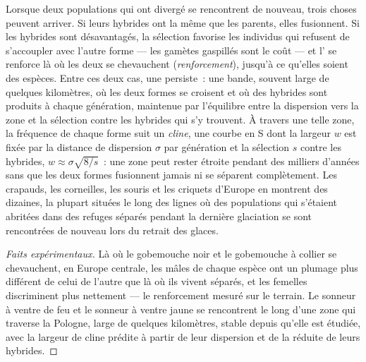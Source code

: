 \begin{proposition}\label{prop:b2:speciation:reinforcement}
Lorsque deux populations qui ont divergé se rencontrent de nouveau, trois
choses peuvent arriver. Si leurs hybrides ont la même  que
les parents, elles fusionnent. Si les hybrides sont désavantagés, la
sélection favorise les individus qui refusent de s'accoupler avec l'autre
forme --- les gamètes gaspillés sont le coût --- et l' se renforce là où les deux se chevauchent
(\emph{renforcement}), jusqu'à ce qu'elles soient des espèces. Entre ces
deux cas, une \emph{} persiste~: une bande, souvent large de
quelques kilomètres, où les deux formes se croisent et où des hybrides
sont produits à chaque génération, maintenue par l'équilibre entre la
dispersion vers la zone et la sélection contre les hybrides qui s'y
trouvent. À travers une telle zone, la fréquence de chaque forme suit un
\emph{cline}, une courbe en S dont la largeur $w$ est fixée par la
distance de dispersion $\sigma$ par génération et la sélection $s$ contre
les hybrides, $w \approx
\sigma\sqrt{8/s}$~: une zone peut rester étroite pendant des milliers
d'années sans que les deux formes fusionnent jamais ni se séparent
complètement. Les crapauds, les corneilles, les souris et les criquets
d'Europe en montrent des dizaines, la plupart situées le long des lignes
où des populations qui s'étaient abritées dans des refuges séparés
pendant la dernière glaciation se sont rencontrées de nouveau lors du
retrait des glaces.
\end{proposition}
\begin{proof}[Faits expérimentaux]
Là où le gobemouche noir et le gobemouche à collier se chevauchent, en
Europe centrale, les mâles de chaque espèce ont un plumage plus différent
de celui de l'autre que là où ils vivent séparés, et les femelles
discriminent plus nettement --- le renforcement mesuré sur le terrain.
Le sonneur à ventre de feu et le sonneur à ventre jaune se rencontrent le
long d'une zone qui traverse la Pologne, large de quelques kilomètres,
stable depuis qu'elle est étudiée, avec la largeur de cline prédite à
partir de leur dispersion et de la  réduite de leurs
hybrides.
\end{proof}

